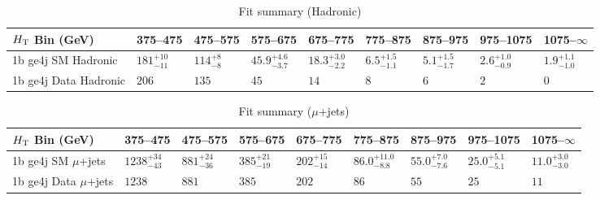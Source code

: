 \documentclass[8pt]{article}
\def\scalht{\mbox{$H_{\rm{T}}$}\xspace}
\newcommand\T{\rule{0pt}{2.6ex}}
\begin{document}
\begin{table}[ht!]
\caption{Fit summary (Hadronic)}
\label{tab:ensemble-summary}
\centering
\begin{tabular}{ lllllllll }

\hline
\scalht Bin (GeV)       & 375--475                       & 475--575                       & 575--675                       & 675--775                       & 775--875                       & 875--975                       & 975--1075                      & 1075--$\infty$                 \\ [1.000000ex]
\hline
1b ge4j SM Hadronic\T   & $181^{+10}_{-11}$              & $114^{+8}_{-8}$                & $45.9^{+4.6}_{-3.7}$           & $18.3^{+3.0}_{-2.2}$           & $6.5^{+1.5}_{-1.1}$            & $5.1^{+1.5}_{-1.7}$            & $2.6^{+1.0}_{-0.9}$            & $1.9^{+1.1}_{-1.0}$            \\ 
1b ge4j Data Hadronic\T & $206$                          & $135$                          & $45$                           & $14$                           & $8$                            & $6$                            & $2$                            & $0$                            \\ 
\hline

\end{tabular}
\end{table}
\begin{table}[ht!]
\caption{Fit summary ($\mu$+jets)}
\label{tab:ensemble-summary}
\centering
\begin{tabular}{ lllllllll }

\hline
\scalht Bin (GeV)       & 375--475                       & 475--575                       & 575--675                       & 675--775                       & 775--875                       & 875--975                       & 975--1075                      & 1075--$\infty$                 \\ [1.000000ex]
\hline
1b ge4j SM $\mu$+jets\T & $1238^{+34}_{-43}$             & $881^{+24}_{-36}$              & $385^{+21}_{-19}$              & $202^{+15}_{-14}$              & $86.0^{+11.0}_{-8.8}$          & $55.0^{+7.0}_{-7.6}$           & $25.0^{+5.1}_{-5.1}$           & $11.0^{+3.0}_{-3.0}$           \\ 
1b ge4j Data $\mu$+jets\T & $1238$                         & $881$                          & $385$                          & $202$                          & $86$                           & $55$                           & $25$                           & $11$                           \\ 
\hline

\end{tabular}
\end{table}
\end{document}

